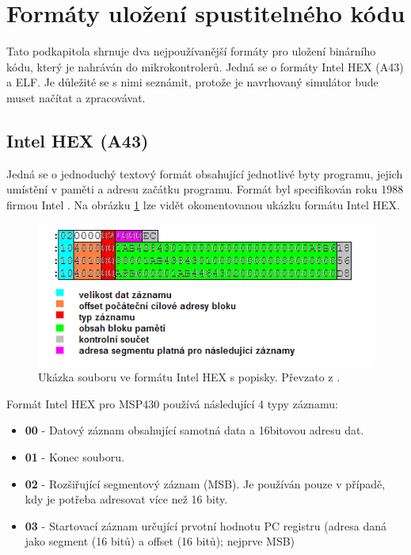 \section{Formáty uložení spustitelného kódu}

Tato podkapitola shrnuje dva nejpoužívanější formáty pro uložení binárního kódu, který je nahráván do mikrokontrolerů. Jedná se o formáty Intel HEX (A43) a ELF. Je důležité se s nimi seznámit, protože je navrhovaný simulátor bude muset načítat a zpracovávat.

\subsection{Intel HEX (A43)}

Jedná se o jednoduchý textový formát obsahující jednotlivé byty programu, jejich umístění v paměti a adresu začátku programu. Formát byl specifikován roku 1988 firmou Intel \cite{intelhex}. Na obrázku \ref{fig:intelhex} lze vidět okomentovanou ukázku formátu Intel HEX.

\begin{figure}[ht]
\centering
\includegraphics[trim=0cm 0cm 0cm 0cm, scale=0.7]{fig/intelhex}
\caption{Ukázka souboru ve formátu Intel HEX s popisky. Převzato z \cite{intelhex2}.}
\label{fig:intelhex}
\end{figure}

Formát Intel HEX pro MSP430 používá následující 4 typy záznamu:

\begin{itemize}
\item \textbf{00} - Datový záznam obsahující samotná data a 16bitovou adresu dat.
\item \textbf{01} - Konec souboru.
\item \textbf{02} - Rozšiřující segmentový záznam (MSB). Je používán pouze v případě, kdy je potřeba adresovat více než 16 bity.
\item \textbf{03} - Startovací záznam určující prvotní hodnotu PC registru (adresa daná jako segment (16 bitů) a offset (16 bitů); nejprve MSB)
\end{itemize}


